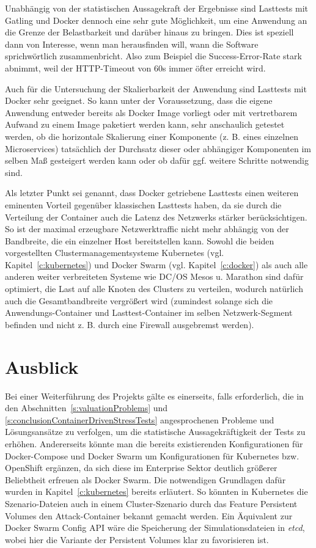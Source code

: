 Unabh\"angig von der statistischen Aussagekraft der Ergebnisse sind Lasttests mit Gatling und Docker dennoch eine sehr gute M\"oglichkeit, um eine Anwendung an die Grenze der Belastbarkeit und dar\"uber hinaus zu bringen.
Dies ist speziell dann von Interesse, wenn man herausfinden will, wann die Software sprichw\"ortlich \glqq{}zusammenbricht\grqq{}.
Also zum Beispiel die Success-Error-Rate stark abnimmt, weil der HTTP-Timeout von 60s immer \"ofter erreicht wird.

Auch f\"ur die Untersuchung der Skalierbarkeit der Anwendung sind Lasttests mit Docker sehr geeignet.
So kann unter der Voraussetzung, dass die eigene Anwendung entweder bereits als Docker Image vorliegt oder mit vertretbarem Aufwand zu einem Image paketiert werden kann, sehr anschaulich getestet werden, ob die horizontale Skalierung einer Komponente (z. B. eines einzelnen Microservices) tats\"achlich der Durchsatz dieser oder abh\"angiger Komponenten im selben Ma\ss{} gesteigert werden kann oder ob daf\"ur ggf. weitere Schritte notwendig sind.

Als letzter Punkt sei genannt, dass Docker getriebene Lasttests einen weiteren eminenten Vorteil gegen\"uber klassischen Lasttests haben, da sie durch die Verteilung der Container auch die Latenz des Netzwerks st\"arker ber\"ucksichtigen.
So ist der maximal erzeugbare Netzwerktraffic nicht mehr abh\"angig von der Bandbreite, die ein einzelner Host bereitstellen kann.
Sowohl die beiden vorgestellten Clustermanagementsysteme Kubernetes (vgl. Kapitel~\ref{c:kubernetes}) und Docker Swarm (vgl. Kapitel~\ref{c:docker}) als auch alle anderen weiter verbreiteten Systeme wie DC/OS Mesos u. Marathon sind daf\"ur optimiert, die Last auf alle Knoten des Clusters zu verteilen, wodurch nat\"urlich auch die Gesamtbandbreite vergr\"o\ss{}ert wird (zumindest solange sich die Anwendungs-Container und Lasttest-Container im selben Netzwerk-Segment befinden und nicht z. B. durch eine Firewall ausgebremst werden).

\section{Ausblick}

Bei einer Weiterf\"uhrung des Projekts g\"alte es einerseits, falls erforderlich, die in den Abschnitten~\ref{s:valuationProblems} und \ref{s:conclusionContainerDrivenStressTests} angesprochenen Probleme und L\"osungsans\"atze zu verfolgen, um die statistische Aussagekr\"aftigkeit der Tests zu erh\"ohen.
Andererseits k\"onnte man die bereits existierenden Konfigurationen f\"ur Docker-Compose und Docker Swarm um Konfigurationen f\"ur Kubernetes bzw. OpenShift erg\"anzen, da sich diese im Enterprise Sektor deutlich gr\"o\ss{}erer Beliebtheit erfreuen als Docker Swarm.
Die notwendigen Grundlagen daf\"ur wurden in Kapitel~\ref{c:kubernetes} bereits erl\"autert.
So k\"onnten in Kubernetes die Szenario-Dateien auch in einem Cluster-Szenario durch das Feature \glqq{}Persistent Volumes\grqq{} den Attack-Container bekannt gemacht werden.
Ein \"Aquivalent zur Docker Swarm Config API w\"are die Speicherung der Simulationsdateien in \textit{etcd}, wobei hier die Variante der Persistent Volumes klar zu favorisieren ist.

